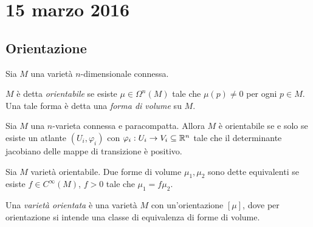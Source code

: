 \chapter{15 marzo 2016}




\section{Orientazione}

Sia $M$ una varietà $n$-dimensionale connessa.

\begin{definition}
	$M$ è detta \emph{orientabile} se esiste $\mu\in\Omega^n(M)$ tale che $\mu(p)\not=0$ per ogni $p\in M$. Una tale forma è detta una \emph{forma di volume} su $M$.
\end{definition}

\begin{proposition}
	Sia $M$ una $n$-varieta connessa e paracompatta. Allora $M$ è orientabile se e solo se esiste un atlante $(U_i,\varphi_i)$ con $\varphi_i:U_i\to V_i\subseteq \mathbb R^n$ tale che il determinante jacobiano delle mappe di transizione è positivo.
\end{proposition}

\begin{definition}
	Sia $M$ varietà orientabile. Due forme di volume $\mu_1,\mu_2$ sono dette equivalenti se esiste $f\in C^\infty(M)$, $f>0$ tale che $\mu_1= f \mu_2$.
	
	Una \emph{varietà orientata} è una varietà $M$ con un'orientazione $[\mu]$, dove per orientazione si intende una classe di equivalenza di forme di volume.
\end{definition}


